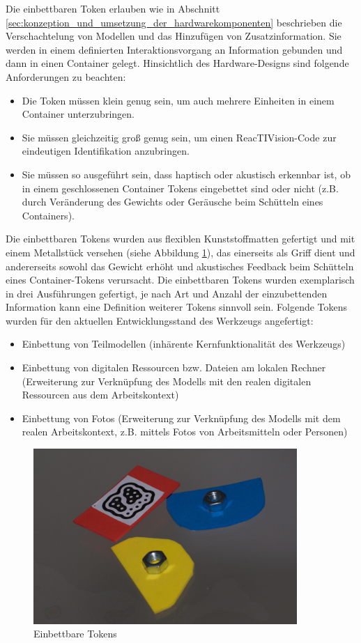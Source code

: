 Die einbettbaren Token erlauben wie in Abschnitt \ref{sec:konzeption_und_umsetzung_der_hardwarekomponenten} beschrieben die Verschachtelung von Modellen und das Hinzufügen von Zusatzinformation. Sie werden in einem definierten Interaktionsvorgang an Information gebunden und dann in einen Container gelegt. Hinsichtlich des Hardware-Designs sind folgende Anforderungen zu beachten:
\begin{itemize}
	\item Die Token müssen klein genug sein, um auch mehrere Einheiten in einem Container unterzubringen.
	\item Sie müssen gleichzeitig groß genug sein, um einen ReacTIVision-Code zur eindeutigen Identifikation anzubringen.
	\item Sie müssen so ausgeführt sein, dass haptisch oder akustisch erkennbar ist, ob in einem geschlossenen Container Tokens eingebettet sind oder nicht (z.B. durch Veränderung des Gewichts oder Geräusche beim Schütteln eines Containers).
\end{itemize}

Die einbettbaren Tokens wurden aus flexiblen Kunststoffmatten gefertigt und mit einem Metallstück versehen (siehe Abbildung \ref{fig:img_SystemNeu_EinbettbareTokens}), das einerseits als Griff dient und andererseits sowohl das Gewicht erhöht und akustisches Feedback beim Schütteln eines Container-Tokens verursacht. Die einbettbaren Tokens wurden exemplarisch in drei Ausführungen gefertigt, je nach Art und Anzahl der einzubettenden Information kann eine Definition weiterer Tokens sinnvoll sein. Folgende Tokens wurden für den aktuellen Entwicklungsstand des Werkzeugs angefertigt:
\begin{itemize}
	\item Einbettung von Teilmodellen (inhärente Kernfunktionalität des Werkzeugs)
	\item Einbettung von digitalen Ressourcen bzw. Dateien am lokalen Rechner (Erweiterung zur Verknüpfung des Modells mit den realen digitalen Ressourcen aus dem Arbeitskontext)
	\item Einbettung von Fotos (Erweiterung zur Verknüpfung des Modells mit dem realen Arbeitskontext, z.B. mittels Fotos von Arbeitsmitteln oder Personen)
\end{itemize}

\begin{figure}[htbp]
	\centering
		\includegraphics[width=10cm]{img/SystemNeu/EinbettbareTokens.jpg}
	\caption{Einbettbare Tokens}
	\label{fig:img_SystemNeu_EinbettbareTokens}
\end{figure}

